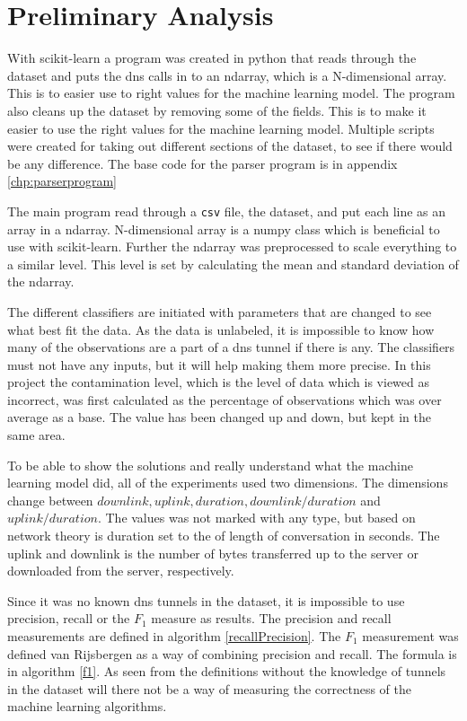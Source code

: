 \chapter{Preliminary Analysis}
\label{chp:results}

With scikit-learn a program was created in python that reads through the dataset and puts the \gls{dns} calls in to an ndarray, which is a N-dimensional array. This is to easier use to right values for the machine learning model. The program also cleans up the dataset by removing some of the fields. This is to make it easier to use the right values for the machine learning model. Multiple scripts were created for taking out different sections of the dataset, to see if there would be any difference. The base code for the parser program is in appendix \ref{chp:parserprogram}

The main program read through a \texttt{csv} file, the dataset, and put each line as an array in a ndarray. N-dimensional array is a numpy class which is beneficial to use with scikit-learn. Further the ndarray was preprocessed to scale everything to a similar level. This level is set by calculating the mean and standard deviation of the ndarray. 

The different classifiers are initiated with parameters that are changed to see what best fit the data. As the data is unlabeled, it is impossible to know how many of the observations are a part of a \gls{dns} tunnel if there is any. The classifiers must not have any inputs, but it will help making them more precise. In this project the contamination level, which is the level of data which is viewed as incorrect, was first calculated as the percentage of observations which was over average as a base. The value has been changed up and down, but kept in the same area. 

To be able to show the solutions and really understand what the machine learning model did, all of the experiments used two dimensions. The dimensions change between $downlink, uplink, duration, downlink/duration$ and $uplink/duration$. The values was not marked with any type, but based on network theory is duration set to the of length of conversation in seconds. The uplink and downlink is  the number of bytes transferred up to the server or downloaded from the server, respectively.

Since it was no known \gls{dns} tunnels in the dataset, it is impossible to use precision, recall or the $F_1$ measure as results. The precision and recall measurements are defined in algorithm \ref{recallPrecision}. The $F_1$ measurement was defined van Rijsbergen \cite{manevitz2002one} as a way of combining precision and recall. The formula is in algorithm \ref{f1}. As seen from the definitions without the knowledge of tunnels in the dataset will there not be a way of measuring the correctness of the machine learning algorithms.

